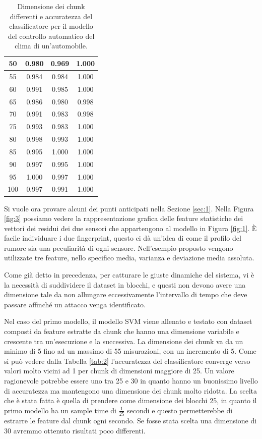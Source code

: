 \documentclass[Lau,binding=0.6cm]{sapthesis}
\begin{document}
\begin{table}[htb]
\begin{center}
\begin{tabular}{|c|c|c|c|}
        \hline
        50 & 0.980 & 0.969 & 1.000 \\
        \hline
        55 & 0.984 & 0.984 & 1.000 \\
        \hline
        60 & 0.991 & 0.985 & 1.000 \\
        \hline
        65 & 0.986 & 0.980 & 0.998 \\
        \hline
        70 & 0.991 & 0.983 & 0.998 \\
        \hline
        75 & 0.993 & 0.983 & 1.000 \\
        \hline
        80 & 0.998 & 0.993 & 1.000 \\
        \hline
        85 & 0.995 & 1.000 & 1.000 \\
        \hline
        90 & 0.997 & 0.995 & 1.000 \\
        \hline
        95 & 1.000 & 0.997 & 1.000 \\
        \hline
        100 & 0.997 & 0.991 & 1.000 \\
        \hline
    \end{tabular}
    \end{center}
    \caption{Dimensione dei chunk differenti e accuratezza del classificatore per il modello del controllo automatico del clima di un'automobile.}
    \label{tab:3}
\end{table}

Si vuole ora provare alcuni dei punti anticipati nella Sezione \ref{sec:1}.
Nella Figura \ref{fig:3} possiamo vedere la rappresentazione grafica delle feature statistiche dei vettori dei residui dei due sensori che appartengono al modello in Figura \ref{fig:1}.
\`E facile individuare i due fingerprint, questo ci d\`a un'idea di come il profilo del rumore sia una peculiarit\`a di ogni sensore. Nell'esempio proposto vengono utilizzate tre feature, nello specifico media, varianza e deviazione media assoluta.

Come gi\`a detto in precedenza, per catturare le giuste dinamiche del sistema, vi \`e la necessit\`a di suddividere il dataset in blocchi, e questi non devono avere una dimensione tale da non allungare eccessivamente l'intervallo di tempo che deve passare affinch\'e un attacco venga identificato.

Nel caso del primo modello, il modello SVM viene allenato e testato con dataset composti da feature estratte da chunk che hanno una dimensione variabile e crescente tra un'esecuzione e la successiva. La dimensione dei chunk va da un minimo di 5 fino ad un massimo di 55 misurazioni, con un incremento di 5.
Come si pu\`o vedere dalla Tabella \ref{tab:2} l'accuratezza del classificatore converge verso valori molto vicini ad 1 per chunk di dimensioni maggiore di 25.
Un valore ragionevole potrebbe essere uno tra 25 e 30 in quanto hanno un buonissimo livello di accuratezza ma mantengono una dimensione dei chunk molto ridotta.
La scelta che \`e stata fatta \`e quella di prendere come dimensione dei blocchi 25, in quanto il primo modello ha un sample time di $\frac{1}{25}$ secondi e questo permetterebbe di estrarre le feature dal chunk ogni secondo.
Se fosse stata scelta una dimensione di 30 avremmo ottenuto risultati poco differenti.
\end{document}
